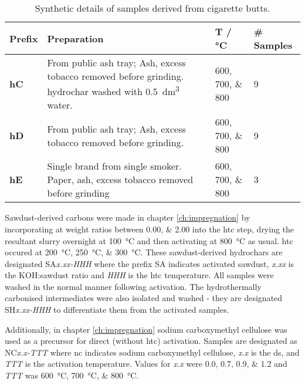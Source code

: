 \begin{table}[t]
    \caption{Synthetic details of samples derived from cigarette butts.}
    \label{tb:cb_synthesis}
    \begin{tabularx}{\textwidth}{lXXl}
        \toprule
            \textbf{Prefix} & \textbf{Preparation} & \textbf{T / \unit{\degreeCelsius}} & \textbf{\# Samples} \\ 
        \midrule
            \textbf{hC}     & From public ash tray; Ash, excess tobacco removed before grinding. \Gls{hydrochar} washed with \qty{0.5}{\dm\cubed} water.              & \numlist[list-final-separator={, }]{600;700;800} & 9              \\
            \textbf{hD}     &  From public ash tray; Ash, excess tobacco removed before grinding.             & \numlist[list-final-separator={, }]{600;700;800} & 9             \\
            \textbf{hE}     & Single brand from single smoker. Paper, ash, excess tobacco removed before grinding              & \numlist[list-final-separator={, }]{600;700;800} & 3              \\
        \bottomrule
    \end{tabularx}%
\end{table}

Sawdust-derived carbons were made in chapter \ref{ch:impregnation} by incorporating  at weight ratios between \numlist{0.00;2.00} into the \gls{htc} step, drying the resultant slurry overnight at \qty{100}{\degreeCelsius} and then activating at \qty{800}{\degreeCelsius} as usual. \Gls{htc} occured at \qtylist[list-units=single]{200;250;300}{\degreeCelsius}. These sawdust-derived \glspl{hydrochar} are designated SA\textit{x.xx-HHH} where the prefix SA indicates activated sawdust, \textit{x.xx} is the KOH:sawdust ratio and \textit{HHH} is the \gls{htc} temperature. All samples were washed in the normal manner following activation. The hydrothermally carbonised intermediates were also isolated and washed - they are designated  SH\textit{x.xx-HHH} to differentiate them from the activated samples.

Additionally, in chapter \ref{ch:impregnation} sodium carboxymethyl cellulose was used as a precursor for direct (without \gls{htc}) activation.  Samples are designated as NC\textit{x.x-TTT} where \acrshort{nc} indicates sodium carboxymethyl cellulose, \textit{x.x} is the \acrshort{ds}, and \textit{TTT} is the activation temperature. Values for \textit{x.x} were \numlist{0.0;0.7;0.9;1.2} and \textit{TTT} was \qtylist[list-units=single]{600;700;800}{\degreeCelsius}.


